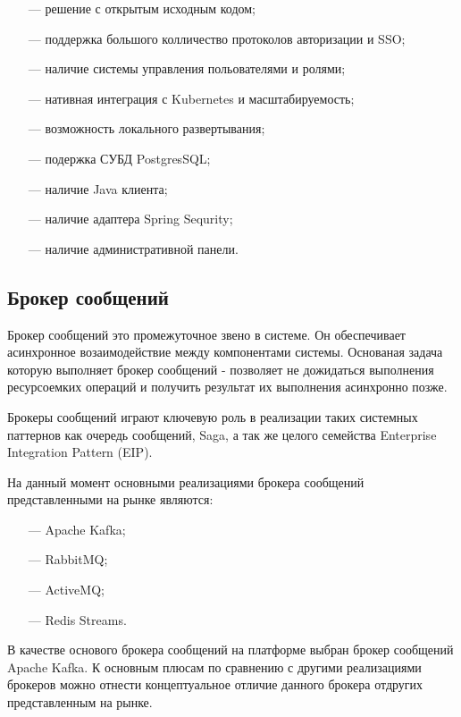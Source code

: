 \begin{itemize}
  \item[---]решение с открытым исходным кодом;
  \item[---]поддержка большого колличество протоколов авторизации и SSO;
  \item[---]наличие системы управления польователями и ролями;
  \item[---]нативная интеграция с Kubernetes и масштабируемость;
  \item[---]возможность локального развертывания;
  \item[---]подержка СУБД PostgresSQL;
  \item[---]наличие Java клиента;
  \item[---]наличие адаптера Spring Sequrity;
  \item[---]наличие административной панели. 
\end{itemize}

\subsection{Брокер сообщений}

Брокер сообщений это промежуточное звено в системе. Он обеспечивает асинхронное возаимодействие между компонентами системы. Основаная задача которую выполняет брокер сообщений - позволяет не дожидаться выполнения ресурсоемких операций и получить результат их выполнения асинхронно позже. 

Брокеры сообщений играют ключевую роль в реализации таких системных паттернов как очередь сообщений\cite{raje2019performance}, Saga\cite{durr2021evaluation}, а так же целого семейства Enterprise Integration Pattern (EIP)\cite{hohpe2004enterprise}.

На данный момент основными реализациями брокера сообщений представленными на рынке являются:

\begin{itemize}
  \item[---]Apache Kafka;
  \item[---]RabbitMQ;
  \item[---]ActiveMQ;
  \item[---]Redis Streams.
\end{itemize}

В качестве основого брокера сообщений на платформе выбран брокер сообщений Apache Kafka.
К основным плюсам по сравнению с другими реализациями брокеров можно отнести концептуальное отличие данного брокера отдругих представленным на рынке.

